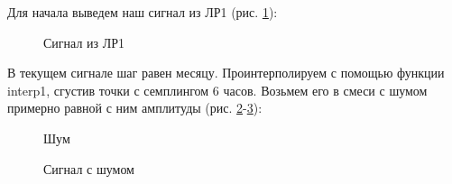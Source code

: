 \documentclass[a4paper,oneside,14pt]{extreport}
\begin{document}
Для начала выведем наш сигнал из ЛР1 (рис. \ref{task3_signal}):
\begin{figure}[!h]
	\caption{Сигнал из ЛР1}
	\label{task3_signal}
\end{figure}

В текущем сигнале шаг равен месяцу. Проинтерполируем с помощью функции interp1, сгустив точки с семплингом 6 часов. Возьмем его в смеси с шумом примерно равной с ним амплитуды (рис. \ref{task3_noise}-\ref{task3_signal_noise}):

\begin{figure}[!h]
	\caption{Шум}
	\label{task3_noise}
\end{figure}

\newpage
\begin{figure}[!h]
\caption{Сигнал с шумом}
\label{task3_signal_noise}
\end{figure}
\end{document}
